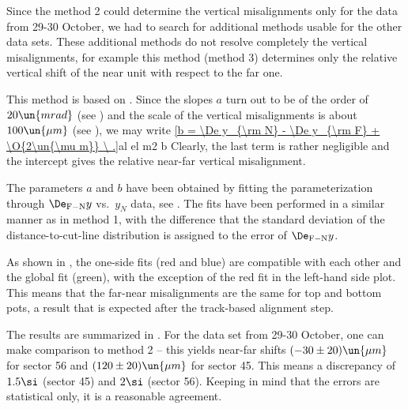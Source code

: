 


Since the method 2 could determine the vertical misalignments only for the data from 29-30 October, we had to search for additional methods usable for the other data sets. These additional methods do not resolve completely the vertical misalignments, for example this method (method 3) determines only the relative vertical shift of the near unit with respect to the far one.

This method is based on . Since the slopes $a$ turn out to be of the order of $20\un{mrad}$ (see ) and the scale of the vertical misalignments is about $100\un{\mu m}$ (see ), we may write
\eqref{b = \De y_{\rm N} - \De y_{\rm F} + \O{2\un{\mu m}} \ .}{al el m2 b}
Clearly, the last term is rather negligible and the intercept gives the relative near-far vertical misalignment.

The parameters $a$ and $b$ have been obtained by fitting the parameterization  through $\De_{\rm F-N} y$ vs.~$y_{N}$ data, see . The fits have been performed in a similar manner as in method 1, with the difference that the standard deviation of the distance-to-cut-line distribution is assigned to the error of $\De_{\rm F-N} y$.

As shown in , the one-side fits (red and blue) are compatible with each other and the global fit (green), with the exception of the red fit in the left-hand side plot. This means that the far-near misalignments are the same for top and bottom pots, a result that is expected after the track-based alignment step.


The results are summarized in . For the data set from 29-30 October, one can make comparison to method 2 -- this yields near-far shifts $(-30\pm 20)\un{\mu m}$ for sector 56 and $(120\pm 20)\un{\mu m}$ for sector 45. This means a discrepancy of $1.5\si$ (sector 45) and $2\si$ (sector 56). Keeping in mind that the errors are statistical only, it is a reasonable agreement.

